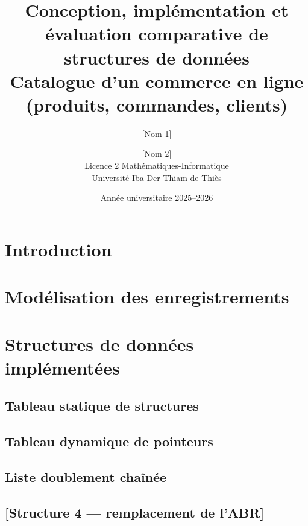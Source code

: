 \documentclass[12pt,a4paper]{report}
\title{Conception, implémentation et évaluation comparative de structures de données \\
       \large Catalogue d'un commerce en ligne (produits, commandes, clients)}
\author{[Nom 1] \and [Nom 2] \\ Licence 2 Mathématiques-Informatique \\ Université Iba Der Thiam de Thiès}
\date{Année universitaire 2025--2026}
\begin{document}
\maketitle
\tableofcontents

\chapter{Introduction}

\chapter{Modélisation des enregistrements}

\chapter{Structures de données implémentées}

\section{Tableau statique de structures}

\section{Tableau dynamique de pointeurs}

\section{Liste doublement chaînée}

\section{[Structure 4 — remplacement de l'ABR]}
\end{document}
